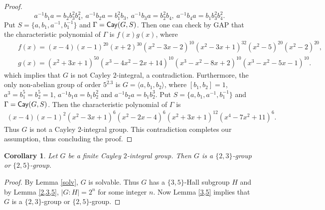 \documentclass{amsart}
\newtheorem{core}[thm]{Corollary}
\def\Cay{{\sf Cay}} \def\Ker{{\sf Ker}}
\begin{document}
\begin{proof}
\[a^{-1}b_1a=b_2b_3^2b_4^2,~a^{-1}b_2a=b_1^2b_3,~a^{-1}b_3a=b_2^2b_4,~a^{-1}b_4a=b_1b_3^2b_4^2.\]
 Put $S=\{a,b_1,a^{-1},b_1^{-1}\}$ and $\Gamma=\Cay(G,S)$. Then one can check by GAP that the characteristic polynomial of $\Gamma$ is $f(x)g(x)$, where  
 \begin{eqnarray*}
 	&&f(x)=(x-4)(x-1)^{20}(x+2)^{30}(x^2-3x-2)^{10}(x^2-3x+1)^{32}(x^2-5)^{20}(x^2-2)^{20},\\
 	&&g(x)=(x^2+3x+1)^{50}(x^3-4x^2-2x+14)^{10}(x^3-x^2-8x+2)^{10}(x^3-x^2-5x-1)^{10}.
 \end{eqnarray*}
 which implies that $G$ is not Cayley $2$-integral, a contradiction. Furthermore, the only non-abelian group of order $5^2.3$ is $G=\langle a,b_1,b_2\rangle$, where $[b_1,b_2]=1$, $a^3=b_1^5=b_2^5=1$, $a^{-1}b_1a=b_1b_2^2$ and $a^{-1}b_2a=b_1b_2^3$. Put $S=\{a,b_1,a^{-1},b_1^{-1}\}$ and $\Gamma=\Cay(G,S)$. Then the characteristic polynomial of $\Gamma$ is 
 \begin{eqnarray*}
 	(x-4)(x-1)^2(x^2-3x+1)^6(x^2-2x-4)^6(x^2+3x+1)^{12}(x^4-7x^2+11)^6.
 \end{eqnarray*}
  Thus $G$ is not a Cayley $2$-integral group. This contradiction completes our assumption, thus concluding the proof.
\end{proof}

\begin{core}\label{key}
	Let $G$ be a finite Cayley $2$-integral group. Then $G$ is a $\{2,3\}$-group or $\{2,5\}$-group.
\end{core}
\begin{proof}
By Lemma \ref{solv}, $G$ is solvable. Thus $G$ has a $\{3,5\}$-Hall subgroup $H$ and by Lemma \ref{2,3,5}, $|G:H|=2^n$ for some integer $n$. Now Lemma \ref{3,5} implies that $G$ is a $\{2,3\}$-group or $\{2,5\}$-group.
\end{proof}
 
\end{document}
